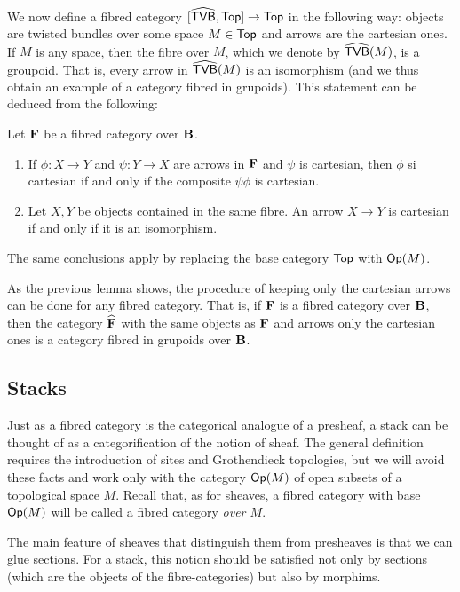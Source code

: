 We now define a fibred category $[\widehat{\mathsf{TVB}},\mathsf{Top}]\to \mathsf{Top}$ in the following way: objects are twisted bundles over some space $M\in \mathsf{Top}$ and arrows are the cartesian ones. If $M$ is any space, then the fibre over $M$, which we denote by $\widehat{\mathsf{TVB}}(M)$, is a groupoid. That is, every arrow in $\widehat{\mathsf{TVB}}(M)$ is an isomorphism (and we thus obtain an example of a category fibred in grupoids). This statement can be deduced from the following:

\begin{lemma}
Let ${\bf F}$ be a fibred category over ${\bf B}$.
\begin{enumerate}
\item If $\phi :X\to Y$ and $\psi :Y\to X$ are arrows in ${\bf F}$ and $\psi$ is cartesian, then $\phi$ si cartesian if and only if the composite $\psi \phi$ is cartesian.
\item Let $X,Y$ be objects contained in the same fibre. An arrow $X\to Y$ is cartesian if and only if it is an isomorphism.
\end{enumerate}
\end{lemma}

The same conclusions apply by replacing the base category $\mathsf{Top}$ with $\mathsf{Op}(M)$.

\begin{obs}
As the previous lemma shows, the procedure of keeping only the cartesian arrows can be done for any fibred category. That is, if ${\bf F}$ is a fibred category over ${\bf B}$, then the category $\widehat{{\bf F}}$ with the same objects as ${\bf F}$ and arrows only the cartesian ones is a category fibred in grupoids over ${\bf B}$.
\end{obs}


\subsection{Stacks}

Just as a fibred category is the categorical analogue of a presheaf, a stack can be thought of as a categorification of the notion of sheaf. The general definition requires the introduction of sites and Grothendieck topologies, but we will avoid these facts and work only with the category $\mathsf{Op}(M)$ of open subsets of a topological space $M$. Recall that, as for sheaves, a fibred category with base $\mathsf{Op}(M)$ will be called a fibred category \emph{over $M$}.

The main feature of sheaves that distinguish them from presheaves is that we can glue sections. For a stack, this notion should be satisfied not only by sections (which are the objects of the fibre-categories) but also by morphims.

